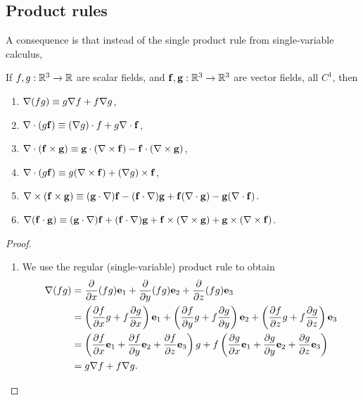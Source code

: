 \documentclass[10pt, a4paper]{article}
\begin{document}
\subsection{Product rules}
A consequence is that instead of the single product rule from single-variable calculus,
\begin{proposition}
    If $f, g : \R ^ 3 \to \R$ are scalar fields,
    and $\vec{f}, \vec{g} : \R ^ 3 \to \R ^ 3$ are vector fields,
    all $C ^ {1}$,
    then
    \begin{enumerate}[label = (\roman*)]
        \item $\bnabla (fg) \equiv g\bnabla f + f\bnabla g$,
        
        \item $\bnabla \cdot (g\vec{f}) \equiv (\bnabla g) \cdot f + g \bnabla \cdot \vec{f}$,
        
        \item $\bnabla \cdot (\vec{f} \times \vec{g}) \equiv \vec{g} \cdot (\bnabla \times \vec{f}) - \vec{f}\cdot(\bnabla \times \vec{g})$,
        
        \item $\bnabla \cdot (g\vec{f}) \equiv g(\bnabla \times \vec{f}) + (\bnabla g) \times \vec{f}$,

        \item $\bnabla \times (\vec{f} \times \vec{g}) \equiv (\vec{g} \cdot \bnabla)\vec{f} - (\vec{f} \cdot \bnabla)\vec{g} + \vec{f}(\bnabla \cdot \vec{g}) - \vec{g}(\bnabla \cdot \vec{f})$.

        \item $\bnabla (\vec{f} \cdot \vec{g}) \equiv (\vec{g} \cdot \bnabla)\vec{f} + (\vec{f} \cdot \bnabla)\vec{g} + \vec{f} \times (\bnabla \times \vec{g}) + \vec{g} \times (\bnabla \times \vec{f})$.
    \end{enumerate}

    \begin{proof}
        \begin{enumerate}[label = (\roman*)]
            \item We use the regular
            (single-variable)
            product rule to obtain
            \begin{align*}
                \bnabla (fg) &= \pd{x}(fg)\vec{e}_1 + \pd{y}(fg)\vec{e}_2 + \pd{z}(fg)\vec{e}_3 \\
                &= \left(\pd[f]{x}g + f\pd[g]{x}\right)\vec{e}_1 + \left(\pd[f]{y}g + f\pd[g]{y}\right)\vec{e}_2 + \left(\pd[f]{z}g + f\pd[g]{z}\right)\vec{e}_3 \\
                &= \left(\pd[f]{x}\vec{e}_1 + \pd[f]{y}\vec{e}_2 + \pd[f]{z}\vec{e}_3\right)g + f\left(\pd[g]{x}\vec{e}_1 + \pd[g]{y}\vec{e}_2 + \pd[g]{z}\vec{e}_3\right) \\
                &= g\bnabla f + f\bnabla g.
            \end{align*}


\end{enumerate}
\end{proof}
\end{proposition}
\end{document}
